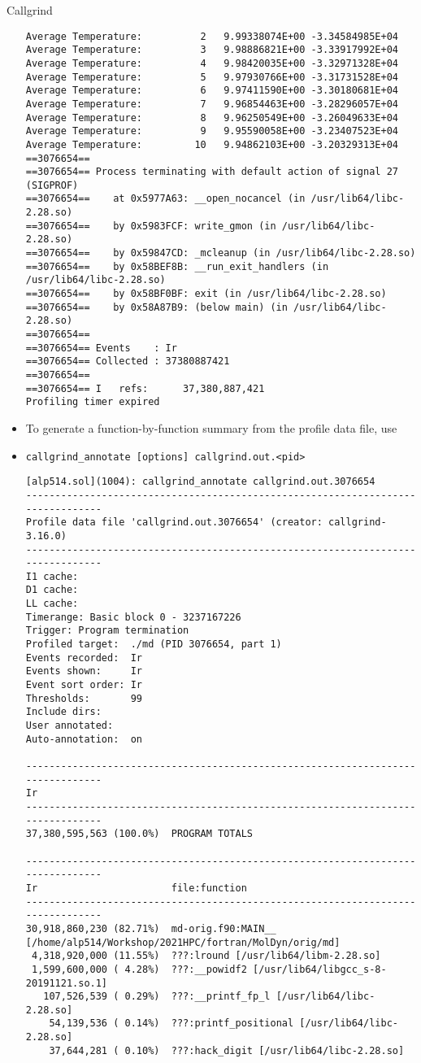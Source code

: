 \documentclass[10pt,t]{beamer}
\begin{document}
\begin{frame}{Callgrind}
\begin{itemize}
\begin{lstlisting}[basicstyle=\fontsize{4.5}{5.5}\selectfont\ttfamily]
Average Temperature:          2   9.99338074E+00 -3.34584985E+04
Average Temperature:          3   9.98886821E+00 -3.33917992E+04
Average Temperature:          4   9.98420035E+00 -3.32971328E+04
Average Temperature:          5   9.97930766E+00 -3.31731528E+04
Average Temperature:          6   9.97411590E+00 -3.30180681E+04
Average Temperature:          7   9.96854463E+00 -3.28296057E+04
Average Temperature:          8   9.96250549E+00 -3.26049633E+04
Average Temperature:          9   9.95590058E+00 -3.23407523E+04
Average Temperature:         10   9.94862103E+00 -3.20329313E+04
==3076654==
==3076654== Process terminating with default action of signal 27 (SIGPROF)
==3076654==    at 0x5977A63: __open_nocancel (in /usr/lib64/libc-2.28.so)
==3076654==    by 0x5983FCF: write_gmon (in /usr/lib64/libc-2.28.so)
==3076654==    by 0x59847CD: _mcleanup (in /usr/lib64/libc-2.28.so)
==3076654==    by 0x58BEF8B: __run_exit_handlers (in /usr/lib64/libc-2.28.so)
==3076654==    by 0x58BF0BF: exit (in /usr/lib64/libc-2.28.so)
==3076654==    by 0x58A87B9: (below main) (in /usr/lib64/libc-2.28.so)
==3076654==
==3076654== Events    : Ir
==3076654== Collected : 37380887421
==3076654==
==3076654== I   refs:      37,380,887,421
Profiling timer expired
      \end{lstlisting}
      \item To generate a function-by-function summary from the profile data file, use
      \item[] \lstinline|callgrind_annotate [options] callgrind.out.<pid>|
        \begin{lstlisting}[basicstyle=\fontsize{4.5}{5.5}\selectfont\ttfamily]
[alp514.sol](1004): callgrind_annotate callgrind.out.3076654
--------------------------------------------------------------------------------
Profile data file 'callgrind.out.3076654' (creator: callgrind-3.16.0)
--------------------------------------------------------------------------------
I1 cache:
D1 cache:
LL cache:
Timerange: Basic block 0 - 3237167226
Trigger: Program termination
Profiled target:  ./md (PID 3076654, part 1)
Events recorded:  Ir
Events shown:     Ir
Event sort order: Ir
Thresholds:       99
Include dirs:
User annotated:
Auto-annotation:  on

--------------------------------------------------------------------------------
Ir
--------------------------------------------------------------------------------
37,380,595,563 (100.0%)  PROGRAM TOTALS

--------------------------------------------------------------------------------
Ir                       file:function
--------------------------------------------------------------------------------
30,918,860,230 (82.71%)  md-orig.f90:MAIN__ [/home/alp514/Workshop/2021HPC/fortran/MolDyn/orig/md]
 4,318,920,000 (11.55%)  ???:lround [/usr/lib64/libm-2.28.so]
 1,599,600,000 ( 4.28%)  ???:__powidf2 [/usr/lib64/libgcc_s-8-20191121.so.1]
   107,526,539 ( 0.29%)  ???:__printf_fp_l [/usr/lib64/libc-2.28.so]
    54,139,536 ( 0.14%)  ???:printf_positional [/usr/lib64/libc-2.28.so]
    37,644,281 ( 0.10%)  ???:hack_digit [/usr/lib64/libc-2.28.so]


\end{lstlisting}
\end{itemize}
\end{frame}
\end{document}
